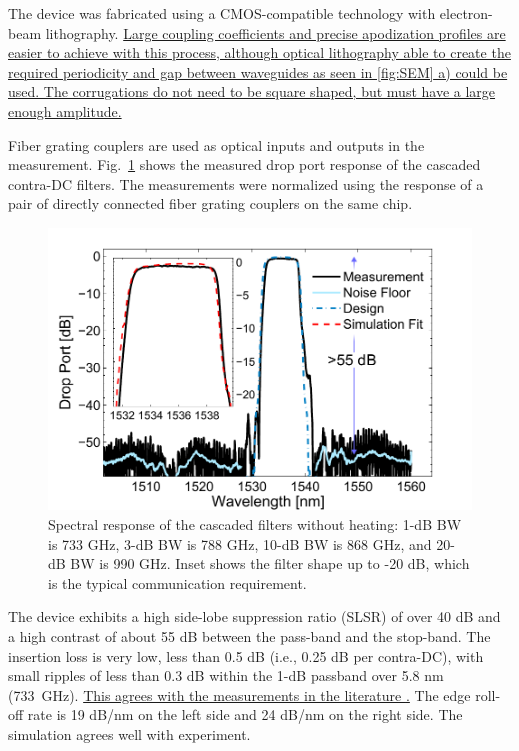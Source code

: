 \documentclass[9pt,twocolumn,twoside]{osajnl}
\begin{document}
	
	
	The device was fabricated using a CMOS-compatible technology with electron-beam lithography. 
	\uline{Large coupling coefficients and precise apodization profiles are easier to achieve with this process, although optical lithography able to create the required periodicity and gap between waveguides as seen in \ref{fig:SEM} a) could be used. The corrugations do not need to be square shaped, but must have a large enough amplitude.}
	
	Fiber grating couplers \cite{zhong2014focusingFGC} are used as optical inputs and outputs in the measurement. 
	Fig.~\ref{fig:passive} shows the measured drop port response of the cascaded contra-DC filters. 
	The measurements were normalized using the response of a pair of directly connected fiber grating couplers on the same chip.
	\begin{figure}[htbp]
		\centering
		\includegraphics[width=.99\columnwidth]{data/Passive62}
		\caption{ Spectral response of the cascaded filters without heating: 1-dB BW is 733 GHz, 3-dB BW is 788 GHz, 10-dB BW is 868 GHz, and 20-dB BW is 990 GHz. Inset shows the filter shape up to -20 dB, which is the typical communication requirement.}
		\label{fig:passive}
	\end{figure}
	
	The device exhibits a high side-lobe suppression ratio (SLSR) of over 40 dB and a high contrast of about 55 dB between the pass-band and the stop-band. 
	The insertion loss is very low, less than 0.5 dB (i.e., 0.25 dB per contra-DC), with small ripples of less than 0.3 dB within the 1-dB passband over 5.8 nm (733~GHz). \uline{This agrees with the measurements in the literature \cite{caverley2015measurement}.}
	The edge roll-off rate is 19 dB/nm on the left side and 24 dB/nm on the right side.
	The simulation agrees well with experiment.
	
\end{document}
